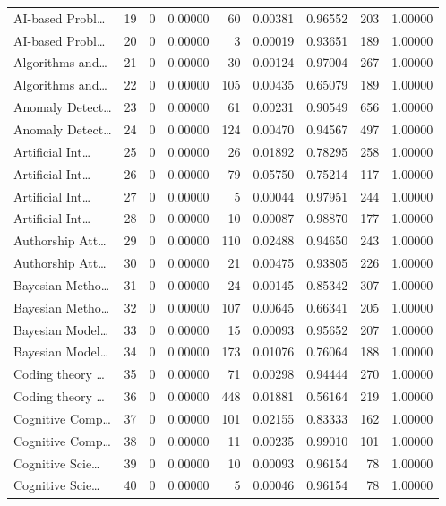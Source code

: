 \begin{table}
\begin{tabular}{lrrrrrrrr}
AI-based Probl… & 19 & 0 & 0.00000 & 60 & 0.00381 & 0.96552 & 203 & 1.00000 \\
AI-based Probl… & 20 & 0 & 0.00000 & 3 & 0.00019 & 0.93651 & 189 & 1.00000 \\
Algorithms and… & 21 & 0 & 0.00000 & 30 & 0.00124 & 0.97004 & 267 & 1.00000 \\
Algorithms and… & 22 & 0 & 0.00000 & 105 & 0.00435 & 0.65079 & 189 & 1.00000 \\
Anomaly Detect… & 23 & 0 & 0.00000 & 61 & 0.00231 & 0.90549 & 656 & 1.00000 \\
Anomaly Detect… & 24 & 0 & 0.00000 & 124 & 0.00470 & 0.94567 & 497 & 1.00000 \\
Artificial Int… & 25 & 0 & 0.00000 & 26 & 0.01892 & 0.78295 & 258 & 1.00000 \\
Artificial Int… & 26 & 0 & 0.00000 & 79 & 0.05750 & 0.75214 & 117 & 1.00000 \\
Artificial Int… & 27 & 0 & 0.00000 & 5 & 0.00044 & 0.97951 & 244 & 1.00000 \\
Artificial Int… & 28 & 0 & 0.00000 & 10 & 0.00087 & 0.98870 & 177 & 1.00000 \\
Authorship Att… & 29 & 0 & 0.00000 & 110 & 0.02488 & 0.94650 & 243 & 1.00000 \\
Authorship Att… & 30 & 0 & 0.00000 & 21 & 0.00475 & 0.93805 & 226 & 1.00000 \\
Bayesian Metho… & 31 & 0 & 0.00000 & 24 & 0.00145 & 0.85342 & 307 & 1.00000 \\
Bayesian Metho… & 32 & 0 & 0.00000 & 107 & 0.00645 & 0.66341 & 205 & 1.00000 \\
Bayesian Model… & 33 & 0 & 0.00000 & 15 & 0.00093 & 0.95652 & 207 & 1.00000 \\
Bayesian Model… & 34 & 0 & 0.00000 & 173 & 0.01076 & 0.76064 & 188 & 1.00000 \\
Coding theory … & 35 & 0 & 0.00000 & 71 & 0.00298 & 0.94444 & 270 & 1.00000 \\
Coding theory … & 36 & 0 & 0.00000 & 448 & 0.01881 & 0.56164 & 219 & 1.00000 \\
Cognitive Comp… & 37 & 0 & 0.00000 & 101 & 0.02155 & 0.83333 & 162 & 1.00000 \\
Cognitive Comp… & 38 & 0 & 0.00000 & 11 & 0.00235 & 0.99010 & 101 & 1.00000 \\
Cognitive Scie… & 39 & 0 & 0.00000 & 10 & 0.00093 & 0.96154 & 78 & 1.00000 \\
Cognitive Scie… & 40 & 0 & 0.00000 & 5 & 0.00046 & 0.96154 & 78 & 1.00000 \\

\end{tabular}
\end{table}
